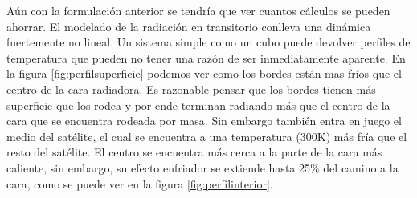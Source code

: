 \documentclass[onecolumn,10pt,titlepage,a4paper]{article}
\begin{document}
Aún con la formulación anterior se tendría que ver cuantos cálculos se pueden ahorrar. El modelado de la radiación en transitorio conlleva una dinámica fuertemente no lineal. Un sistema simple como un cubo puede devolver perfiles de temperatura que pueden no tener una razón de ser inmediatamente aparente. En la figura \ref{fig:perfilsuperficie} podemos ver como los bordes están mas fríos que el centro de la cara radiadora. Es razonable pensar que los bordes tienen más superficie que los rodea y por ende terminan radiando más que el centro de la cara que se encuentra rodeada por masa. Sin embargo también entra en juego el medio del satélite, el cual se encuentra a una temperatura (300K) más fría que el resto del satélite. El centro se encuentra más cerca a la parte de la cara más caliente, sin embargo, su efecto enfriador se extiende hasta 25\% del camino a la cara, como se puede ver en la figura \ref{fig:perfilinterior}. 
\end{document}
